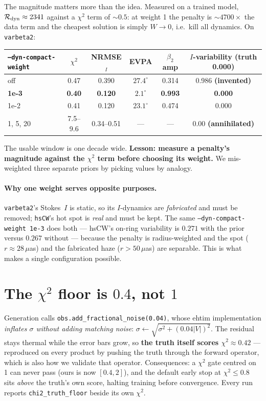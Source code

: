 \documentclass[11pt]{article}
\begin{document}
The magnitude matters more than the idea. Measured on a trained model,
$\mathcal{R}_{\rm dyn}\approx2341$ against a $\chi^2$ term of ${\sim}0.5$: at weight
1 the penalty is ${\sim}4700\times$ the data term and the cheapest solution is simply
$W\!\to\!0$, i.e.\ kill all dynamics. On \texttt{varbeta2}:
\begin{center}
\begin{tabular}{@{}lccccc@{}}
\toprule
\texttt{--dyn-compact-weight} & $\chi^2$ & NRMSE$_I$ & EVPA & $\beta_2$ amp & $I$-variability (truth 0.000) \\
\midrule
off        & 0.47 & 0.390 & $27.4^\circ$ & 0.314 & 0.986 \; \textbf{(invented)} \\
\textbf{1e-3} & \textbf{0.40} & \textbf{0.120} & $\mathbf{2.1^\circ}$ & \textbf{0.993} & \textbf{0.000} \\
1e-2       & 0.41 & 0.120 & $23.1^\circ$ & 0.474 & 0.000 \\
1, 5, 20   & 7.5--9.6 & 0.34--0.51 & --- & --- & 0.00 \; \textbf{(annihilated)} \\
\bottomrule
\end{tabular}
\end{center}
The usable window is one decade wide. \textbf{Lesson: measure a penalty's magnitude
against the $\chi^2$ term before choosing its weight.} We mis-weighted three separate
priors by picking values by analogy.

\paragraph{Why one weight serves opposite purposes.} \texttt{varbeta2}'s Stokes~$I$ is
static, so its $I$-dynamics are \emph{fabricated} and must be removed;
\texttt{hsCW}'s hot spot is \emph{real} and must be kept. The same
\texttt{--dyn-compact-weight 1e-3} does both --- hsCW's on-ring variability is $0.271$
with the prior versus $0.267$ without --- because the penalty is radius-weighted and the
spot ($r\!\approx\!28\,\mu$as) and the fabricated haze ($r\!>\!50\,\mu$as) are
separable. This is what makes a single configuration possible.

\section{The $\chi^2$ floor is $0.4$, not $1$}
\label{sec:floor}

Generation calls \texttt{obs.add\_fractional\_noise(0.04)}, whose ehtim implementation
\emph{inflates $\sigma$ without adding matching noise}:
$\sigma\leftarrow\sqrt{\sigma^2+(0.04|V|)^2}$. The residual stays thermal while the
error bars grow, so \textbf{the truth itself scores $\chi^2\approx0.42$} --- reproduced
on every product by pushing the truth through the forward operator, which is also how
we validate that operator. Consequences: a $\chi^2$ gate centred on 1 can never pass
(ours is now $[0.4,2]$), and the default early stop at $\chi^2\le0.8$ sits
\emph{above} the truth's own score, halting training before convergence. Every run
reports \texttt{chi2\_truth\_floor} beside its own $\chi^2$.
\end{document}
